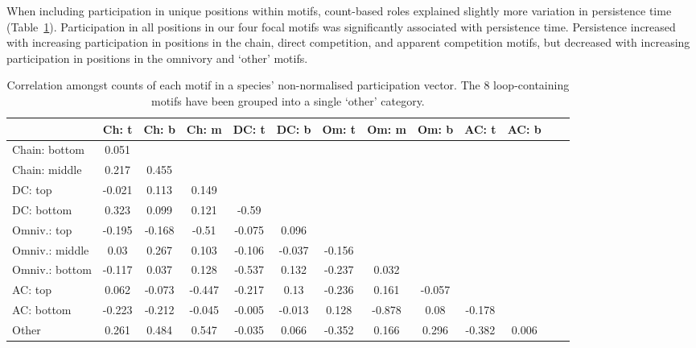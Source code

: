 \documentclass[12pt]{article}
\begin{document}
        
        When including participation in unique positions within motifs, count-based roles explained slightly more variation in persistence time (Table~\ref{tab:position_count_correlations}).
        Participation in all positions in our four focal motifs was significantly associated with persistence time.
        Persistence increased with increasing participation in positions in the chain, direct competition, and apparent competition motifs, but decreased with increasing participation in positions in the omnivory and `other' motifs.


		\begin{table}[hb!]
    		\caption{Correlation amongst counts of each motif in a species' non-normalised participation vector. The 8 loop-containing motifs have been grouped into a single `other' category.}
    		\label{tab:position_count_correlations}
    		\footnotesize
    		\begin{tabular}{l | c c c c c c c c c c c c}    
        		&	Ch: t	&	Ch: b	&	Ch: m	&	DC: t	&	DC: b	&	Om: t	&	Om: m	&	Om: b	&	AC: t	&	AC: b	\\
                \hline
                Chain: bottom	&	0.051	&		&		&		&		&		&		&		&		&		\\
                Chain: middle	&	0.217	&	0.455	&		&		&		&		&		&		&		&		\\
                DC: top	&	-0.021	&	0.113	&	0.149	&		&		&		&		&		&		&		\\
                DC: bottom	&	0.323	&	0.099	&	0.121	&	-0.59	&		&		&		&		&		&		\\
                Omniv.: top	&	-0.195	&	-0.168	&	-0.51	&	-0.075	&	0.096	&		&		&		&		&		\\
                Omniv.: middle	&	0.03	&	0.267	&	0.103	&	-0.106	&	-0.037	&	-0.156	&		&		&		&		\\
                Omniv.: bottom	&	-0.117	&	0.037	&	0.128	&	-0.537	&	0.132	&	-0.237	&	0.032	&		&		&		\\
                AC: top	&	0.062	&	-0.073	&	-0.447	&	-0.217	&	0.13	&	-0.236	&	0.161	&	-0.057	&		&		\\
                AC: bottom	&	-0.223	&	-0.212	&	-0.045	&	-0.005	&	-0.013	&	0.128	&	-0.878	&	0.08	&	-0.178	&		\\
                Other	&	0.261	&	0.484	&	0.547	&	-0.035	&	0.066	&	-0.352	&	0.166	&	0.296	&	-0.382	&	0.006	\\
                \hline
            \end{tabular}
            \end{table}
            
\end{document}
